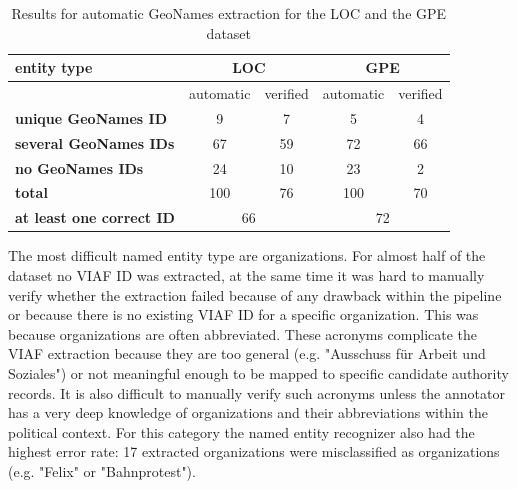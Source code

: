 \documentclass{article}
\begin{document}
\begin{table}[h!]
\begin{tabular}{|l|cc|cc|}
\hline
\textbf{entity type}             & \multicolumn{2}{|c|}{\textbf{LOC}} & \multicolumn{2}{|c|}{\textbf{GPE}} \\\hline
                                 & automatic       & verified       & automatic       & verified       \\\hline
\textbf{unique GeoNames ID}      & 9               & 7              & 5               & 4              \\
\textbf{several GeoNames IDs}    & 67              & 59             & 72              & 66             \\
\textbf{no GeoNames IDs}         & 24              & 10             & 23              & 2              \\
\textbf{total}                   & 100             & 76             & 100             & 70             \\\hline
\textbf{at least one correct ID} & \multicolumn{2}{|c|}{66}           & \multicolumn{2}{|c|}{72}       
\\\hline
\end{tabular}
\caption{Results for automatic GeoNames extraction for the LOC and the GPE dataset}
\label{tab:geonames}
\end{table}
The most difficult named entity type are organizations. For almost half of the dataset no VIAF ID was extracted, at the same time it was hard to manually verify whether the extraction failed because of any drawback within the pipeline or because there is no existing VIAF ID for a specific organization. This was because organizations are often abbreviated. These acronyms complicate the VIAF extraction because they are too general (e.g. "Ausschuss für Arbeit und Soziales") or not meaningful enough to be mapped to specific candidate authority records. It is also difficult to manually verify such acronyms unless the annotator has a very deep knowledge of organizations and their abbreviations within the political context. For this category the named entity recognizer also had the highest error rate: 17 extracted organizations were misclassified as organizations (e.g. "Felix" or "Bahnprotest"). 
\clearpage
\nocite{*}
\printbibliography
\end{document}
